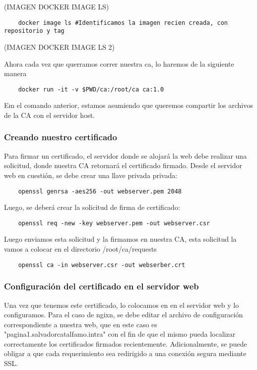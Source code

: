 (IMAGEN DOCKER IMAGE LS)

\begin{verbatim}
    docker image ls #Identificamos la imagen recien creada, con repositorio y tag
\end{verbatim}

(IMAGEN DOCKER IMAGE LS 2)

Ahora cada vez que querramos correr nuestra ca, lo haremos de la siguiente manera
\begin{verbatim}
    docker run -it -v $PWD/ca:/root/ca ca:1.0
\end{verbatim}

Em el comando anterior, estamos asumiendo que queremos compartir los archivos de la CA con el servidor 
host.

 



\subsubsection*{Creando nuestro certificado}

Para firmar un certificado, el servidor donde se alojará la web debe realizar una solicitud, 
donde nuestra CA retornará el certificado firmado. Desde el servidor web en cuestión, se debe 
crear una llave privada privada:

\begin{verbatim}
    openssl genrsa -aes256 -out webserver.pem 2048
\end{verbatim}

\noindent Luego, se deberá crear la solicitud de firma de certificado:
\begin{verbatim}
    openssl req -new -key webserver.pem -out webserver.csr
\end{verbatim}

\noindent Luego enviamos esta solicitud y la firmamos en nuestra CA, esta solicitud la vamos a colocar 
en el directorio /root/ca/requests
\begin{verbatim}
    openssl ca -in webserver.csr -out webserber.crt
\end{verbatim}

\subsubsection*{Configuración del certificado en el servidor web}
\noindent Una vez que tenemos este certificado, lo colocamos en en el servidor web y 
lo configuramos. Para el caso de ngixn, se debe editar el archivo de configuración 
correspondiente a nuestra web, que en este caso es "pagina1.salvadorcatalfamo.intra"
con el fin de que el mismo pueda localizar correctamente los certificados firmados recientemente.
Adicionalmente, se puede obligar a que cada requerimiento sea redirigido a una conexión
segura mediante SSL.


